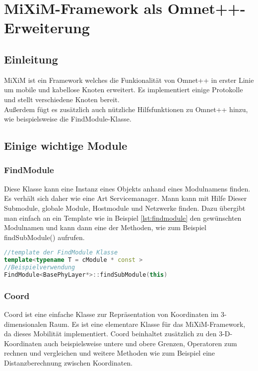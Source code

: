 \section{MiXiM-Framework als Omnet++-Erweiterung}

\subsection{Einleitung}

MiXiM\cite{mixim} ist ein Framework welches die Funkionalität von Omnet++ in erster Linie um mobile und kabellose Knoten erweitert. Es implementiert einige Protokolle und stellt verschiedene Knoten bereit.\\
Außerdem fügt es zusätzlich auch nützliche Hilfsfunktionen zu Omnet++ hinzu, wie beispielsweise die FindModule-Klasse.

\subsection{Einige wichtige Module}

\subsubsection{FindModule}

Diese Klasse kann eine Instanz eines Objekts anhand eines Modulnamens finden. Es verhält sich daher wie eine Art Servicemanager. Mann kann mit Hilfe Dieser Submodule, globale Module, Hostmodule und Netzwerke finden. Dazu übergibt man einfach an ein Template wie in Beispiel \ref{lst:findmodule} den gewünschten Modulnamen und kann dann eine der Methoden, wie zum Beispiel findSubModule() aufrufen.

\begin{lstlisting}[language=C++, caption={Beispiel FindModule}, label=lst:findmodule]
//template der FindModule Klasse
template<typename T = cModule * const >
//Beispielverwendung
FindModule<BasePhyLayer*>::findSubModule(this)
\end{lstlisting}

\subsubsection{Coord}

Coord ist eine einfache Klasse zur Repräsentation von Koordinaten im 3-dimensionalen Raum. Es ist eine elementare Klasse für das MiXiM-Framework, da dieses Mobilität implementiert. Coord beinhaltet zusätzlich zu den 3-D-Koordinaten auch beispielsweise untere und obere Grenzen, Operatoren zum rechnen und vergleichen und weitere Methoden wie zum Beispiel eine Distanzberechnung zwischen Koordinaten.

